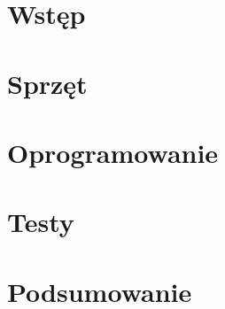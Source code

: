 \chapter{Wstęp}


%

%
%
\chapter{Sprzęt}


\chapter{Oprogramowanie}


\chapter{Testy}


\chapter{Podsumowanie}
\label{ch:podsumowanie}


\nocite{*}